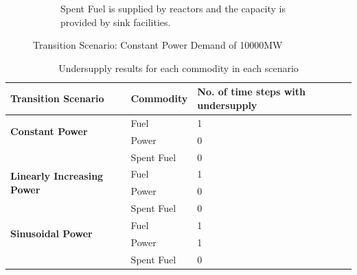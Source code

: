 \documentclass{anstrans}
\begin{document}
\begin{figure}[!htbp]
\begin{subfigure}[t]{0.65\textwidth}
        \caption{Spent Fuel is supplied by reactors and the capacity is provided by sink facilities.}
        \label{fig:constanttransition-spentfuel}
    \end{subfigure}
    \caption{Transition Scenario: Constant Power Demand of 10000MW}
\end{figure}

\begin{table}[htb]
    \centering
    \caption {Undersupply results for each commodity in each scenario}
	\label{tab:transition-scenario-results}
    \begin{tabular}{|l|l|p{4.5cm}|}
    \hline
    \textbf{Transition Scenario}    & \textbf{Commodity}    & \textbf{No. of time steps with undersupply} \\ \hline
    \multirow{2}{*}{\textbf{Constant Power}} & Fuel & 1 \\ \cline{2-3}
                                             & Power & 0 \\ \cline{2-3}
                                             & Spent Fuel & 0 \\ \hline
    \multirow{2}{*}{\textbf{Linearly Increasing Power}} & Fuel & 1 \\ \cline{2-3}
                                             & Power & 0 \\ \cline{2-3}
                                             & Spent Fuel & 0 \\ \hline
    \multirow{2}{*}{\textbf{Sinusoidal Power}} & Fuel & 1 \\ \cline{2-3}
                                             & Power & 1 \\ \cline{2-3}
                                             & Spent Fuel & 0 \\ \hline
    \end{tabular}
\end{table}
\end{document}

